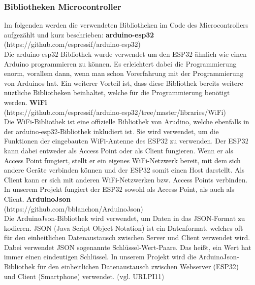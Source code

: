 \documentclass[]{article}
\begin{document}
\subsubsection{Bibliotheken Microcontroller}
Im folgenden werden die verwendeten Bibliotheken im Code des Microcontrollers aufgezählt und kurz beschrieben:
\vspace{4mm}\newline
\textbf{arduino-esp32} \\
(https://github.com/espressif/arduino-esp32) \\
Die arduino-esp32-Bibliothek wurde verwendet um den ESP32 ähnlich wie einen Arduino programmieren zu können. Es erleichtert dabei die Programmierung enorm, vorallem dann, wenn man schon Vorerfahrung mit der Programmierung von Arduinos hat. Ein weiterer Vorteil ist, dass diese Bibliothek bereits weitere nüztliche Bibliotheken beinhaltet, welche für die Programmierung benötigt werden.
\vspace{4mm}\newline
\textbf{WiFi} \\
(https://github.com/espressif/arduino-esp32/tree/master/libraries/WiFi) \\
Die WiFi-Bibliothek ist eine offizielle Bibliothek von Arudino, welche ebenfalls in der arduino-esp32-Bibliothek inkludiert ist. Sie wird verwendet, um die Funktionen der eingebauten WiFi-Antenne des ESP32 zu verwenden. Der ESP32 kann dabei entweder als Access Point oder als Client fungieren. Wenn er als Access Point fungiert, stellt er ein eigenes WiFi-Netzwerk bereit, mit dem sich andere Geräte verbinden können und der ESP32 somit einen Host darstellt. Als Client kann er sich mit anderen WiFi-Netzwerken bzw. Access Points verbinden. In unserem Projekt fungiert der ESP32 sowohl als Access Point, als auch als Client.
\vspace{4mm}\newline
\textbf{ArduinoJson} \\
(https://github.com/bblanchon/ArduinoJson) \\
Die ArduinoJson-Bibliothek wird verwendet, um Daten in das JSON-Format zu kodieren. JSON (Java Script Object Notation) ist ein Datenformat, welches oft für den einheitlichen Datenaustausch zwischen Server und Client verwendet wird. Dabei verwendet JSON sogenannte Schlüssel-Wert-Paare. Das heißt, ein Wert hat immer einen eindeutigen Schlüssel. In unserem Projekt wird die ArduinoJson-Bibliothek für den einheitlichen Datenaustausch zwischen Webserver (ESP32) und Client (Smartphone) verwendet. (vgl. URLPI11)
\end{document}
